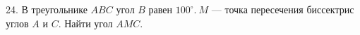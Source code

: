 24. В треугольнике $ABC$ угол $B$ равен $100^\circ.\ M$ --- точка пересечения биссектрис углов $A$ и $C.$ Найти угол $AMC.$\\

